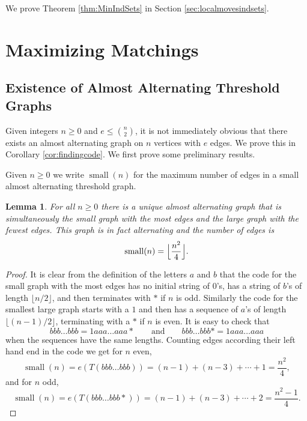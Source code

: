 \documentclass[12pt]{amsart}
\theoremstyle{plain}
\newtheorem{lem}[thm]{Lemma}
\theoremstyle{definition}
\DeclareMathOperator{\sm}{small}
\DeclarePairedDelimiter{\floor}{\lfloor}{\rfloor}
\begin{document}
We prove Theorem \ref{thm:MinIndSets} in Section \ref{sec:localmovesindsets}.

\section{Maximizing Matchings}\label{sec:maxmatch}


\subsection{Existence of Almost Alternating Threshold Graphs}  Given integers $n\geq 0$ and $e\leq \binom{n}{2}$, it is not immediately obvious that there exists an almost alternating graph on $n$ vertices with $e$ edges.  We prove this in Corollary \ref{cor:findingcode}.  We first prove some preliminary results.





Given $n\ge 0$ we write $\sm(n)$ for the maximum number of edges in a small almost alternating threshold graph.


\begin{lem}
    For all $n\ge 0$ there is a unique almost alternating graph that is simultaneously the small graph with the most edges and the large graph with the fewest edges. This graph is in fact alternating and the number of edges is
    \[
        \sm(n) = \floor[\Big]{\frac{n^2}4} .
    \]
\end{lem}
\begin{proof}
    It is clear from the definition of the letters $a$ and $b$ that the code for the small graph with the most edges has no initial string of $0$'s, has a string of $b$'s of length $\lfloor n/2\rfloor$, and then terminates with $*$ if $n$ is odd. Similarly the code for the smallest large graph starts with a $1$ and then has a sequence of $a$'s of length $\lfloor (n-1)/2 \rfloor$, terminating with a $*$ if $n$ is even. It is easy to check that 
    \[
        bbb\dots bbb = 1aaa\dots aaa{*} \qquad \text{and}\qquad bbb\dots bbb* = 1aaa\dots aaa
    \]
    when the sequences have the same lengths. Counting edges according their left hand end in the code we get for $n$ even,
    \[
        \sm(n) = e(T(bbb\dots bbb)) = (n-1)+(n-3)+\cdots+1 = \frac{n^2}{4},
    \]
    and for $n$ odd,
    \[
        \sm(n) = e(T(bbb\dots bbb{*})) = (n-1)+(n-3)+\cdots+2 = \frac{n^2-1}4.
    \]
\end{proof}
\end{document}
